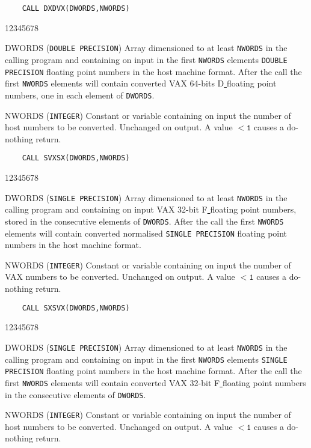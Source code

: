 \begin{verbatim}
    CALL DXDVX(DWORDS,NWORDS)
\end{verbatim}
\begin{DLtt}{12345678}
\item[DWORDS] ({\tt DOUBLE PRECISION}) Array dimensioned to at
least {\tt NWORDS} in the calling program and containing on input in the
first {\tt NWORDS}  elements {\tt DOUBLE PRECISION} floating point
numbers in the host machine format. After the call the first {\tt NWORDS}
elements will contain converted VAX 64-bits D\underline{ }floating point
numbers, one in each element of {\tt DWORDS}.
\item[NWORDS] ({\tt INTEGER}) Constant or variable containing on input
the number of host numbers to be converted. Unchanged on output. A
value $\mathtt{< 1}$ causes a do-nothing return.
\end{DLtt}
\begin{verbatim}
    CALL SVXSX(DWORDS,NWORDS)
\end{verbatim}
\begin{DLtt}{12345678}
\item[DWORDS] ({\tt SINGLE PRECISION}) Array dimensioned to at least
{\tt NWORDS} in the calling program and containing on input VAX 32-bit
F\underline{ }floating point numbers, stored in the consecutive elements
of {\tt DWORDS}. After the call the first {\tt NWORDS} elements will
contain converted normalised {\tt SINGLE PRECISION} floating point
numbers in the host machine format.
\item[NWORDS] ({\tt INTEGER}) Constant or variable containing on input
the number of VAX numbers to be converted. Unchanged on output. A
value $\mathtt{< 1}$ causes a do-nothing return.
\end{DLtt}
\begin{verbatim}
    CALL SXSVX(DWORDS,NWORDS)
\end{verbatim}
\begin{DLtt}{12345678}
\item[DWORDS] ({\tt SINGLE PRECISION}) Array dimensioned to at least
{\tt NWORDS} in the calling program and containing on input in the first
{\tt NWORDS} elements {\tt SINGLE PRECISION} floating point
numbers in the host machine format. After the call the first {\tt NWORDS}
elements will contain converted VAX 32-bit F\underline{ }floating point
numbers in the consecutive elements of {\tt DWORDS}.
\item[NWORDS] ({\tt INTEGER}) Constant or variable containing on input
the number of host numbers to be converted. Unchanged on output. A
value $\mathtt{< 1}$ causes a do-nothing return.
\end{DLtt}
